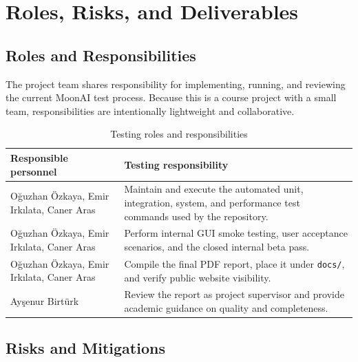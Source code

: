 \section{Roles, Risks, and Deliverables}
\label{sec:roles-risks}

\subsection{Roles and Responsibilities}

The project team shares responsibility for implementing, running, and reviewing the current
MoonAI test process. Because this is a course project with a small team, responsibilities
are intentionally lightweight and collaborative.

\begin{table}[H]
	\centering
	\caption{Testing roles and responsibilities}
	\label{tab:roles}
	\begin{tabularx}{\textwidth}{@{}>{\ttfamily\small}lX@{}}
		\toprule
		\textbf{Responsible personnel}            & \textbf{Testing responsibility}                                                                                     \\
		\midrule
		Oğuzhan Özkaya, Emir Irkılata, Caner Aras & Maintain and execute the automated unit, integration, system, and performance test commands used by the repository. \\
		Oğuzhan Özkaya, Emir Irkılata, Caner Aras & Perform internal GUI smoke testing, user acceptance scenarios, and the closed internal beta pass.                   \\
		Oğuzhan Özkaya, Emir Irkılata, Caner Aras & Compile the final PDF report, place it under \texttt{docs/}, and verify public website visibility.                  \\
		Ayşenur Birtürk                           & Review the report as project supervisor and provide academic guidance on quality and completeness.                  \\
		\bottomrule
	\end{tabularx}
\end{table}

\subsection{Risks and Mitigations}


